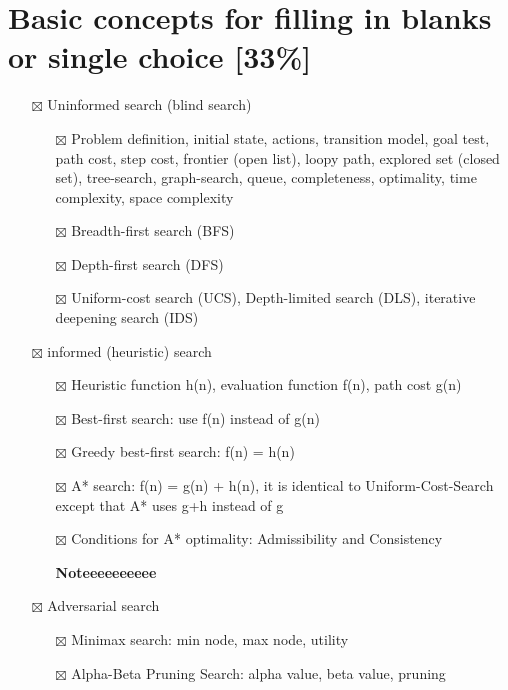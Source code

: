 \documentclass[11pt]{article}
\begin{document}
\section{Basic concepts for filling in blanks or single choice [33\%]}
\label{sec:org8149850}
\begin{itemize}
\item[{$\boxtimes$}] Uninformed search (blind search)
\begin{itemize}
\item[{$\boxtimes$}] Problem definition, initial state, actions, transition model, goal
test, path cost, step cost, frontier (open list), loopy path, explored set
(closed set), tree-search, graph-search, queue, completeness, optimality,
time complexity, space complexity
\item[{$\boxtimes$}] Breadth-first search (BFS)
\item[{$\boxtimes$}] Depth-first search (DFS)
\item[{$\boxtimes$}] Uniform-cost search (UCS), Depth-limited search (DLS), iterative
deepening search (IDS)
\end{itemize}
\item[{$\boxtimes$}] informed (heuristic) search
\begin{itemize}
\item[{$\boxtimes$}] Heuristic function h(n), evaluation function f(n), path cost g(n)
\item[{$\boxtimes$}] Best-first search: use f(n) instead of g(n)
\item[{$\boxtimes$}] Greedy best-first search: f(n) = h(n)
\item[{$\boxtimes$}] A* search: f(n) = g(n) + h(n), it is identical to Uniform-Cost-Search
except that A* uses g+h instead of g
\item[{$\boxtimes$}] Conditions for A* optimality: Admissibility and Consistency

\textbf{Noteeeeeeeeee}
\end{itemize}
\item[{$\boxtimes$}] Adversarial search
\begin{itemize}
\item[{$\boxtimes$}] Minimax search: min node, max node, utility
\item[{$\boxtimes$}] Alpha-Beta Pruning Search: alpha value, beta value, pruning


\end{itemize}
\end{itemize}
\end{document}
